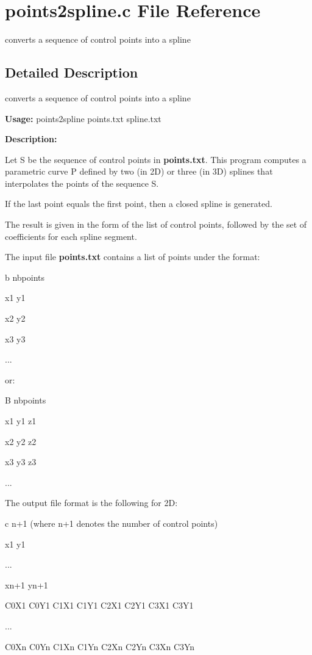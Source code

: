 \section{points2spline.c File Reference}
\label{points2spline_8c}
converts a sequence of control points into a spline  




\label{_details}
\subsection{Detailed Description}
converts a sequence of control points into a spline 

{\bf Usage:} points2spline points.txt spline.txt

{\bf Description:}

Let S be the sequence of control points in {\bf points.txt}. This program computes a parametric curve P defined by two (in 2D) or three (in 3D) splines that interpolates the points of the sequence S.

If the last point equals the first point, then a closed spline is generated.

The result is given in the form of the list of control points, followed by the set of coefficients for each spline segment.

The input file {\bf points.txt} contains a list of points under the format:

b nbpoints\par
 x1 y1\par
 x2 y2\par
 x3 y3\par
 ...\par


or:

B nbpoints\par
 x1 y1 z1\par
 x2 y2 z2\par
 x3 y3 z3\par
 ...\par


The output file format is the following for 2D:

c n+1 (where n+1 denotes the number of control points)\par
 x1 y1\par
 ...\par
 xn+1 yn+1\par
 C0X1 C0Y1 C1X1 C1Y1 C2X1 C2Y1 C3X1 C3Y1\par
 ...\par
 C0Xn C0Yn C1Xn C1Yn C2Xn C2Yn C3Xn C3Yn\par


